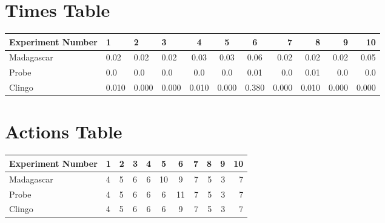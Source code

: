 \documentclass[8pt]{article}
\begin{document}
\begin{landscape}
\section{Times Table}\begin{tabular}{ | l | l | l | l | c | c | c | r | r | r | r | }\hline
Experiment Number & 1 & 2 & 3 & 4 & 5 & 6 & 7 & 8 & 9 & 10\\  \hline
Madagascar & 0.02 & 0.02 & 0.02 & 0.03 & 0.03 & 0.06 & 0.02 & 0.02 & 0.02 & 0.05\\  \hline
Probe & 0.0 & 0.0 & 0.0 & 0.0 & 0.0 & 0.01 & 0.0 & 0.01 & 0.0 & 0.0\\  \hline
Clingo & 0.010 & 0.000 & 0.000 & 0.010 & 0.000 & 0.380 & 0.000 & 0.010 & 0.000 & 0.000\\  \hline
\end{tabular}
\section{Actions Table}\begin{tabular}{ | l | l | l | l | c | c | c | r | r | r | r | }\hline
Experiment Number & 1 & 2 & 3 & 4 & 5 & 6 & 7 & 8 & 9 & 10\\ \hline
 Madagascar & 4 & 5 & 6 & 6 & 10 & 9 & 7 & 5 & 3 & 7\\ \hline
 Probe & 4 & 5 & 6 & 6 & 6 & 11 & 7 & 5 & 3 & 7\\ \hline
 Clingo & 4 & 5 & 6 & 6 & 6 & 9 & 7 & 5 & 3 & 7\\ \hline
\end{tabular}
\end{landscape}
\end{document}
